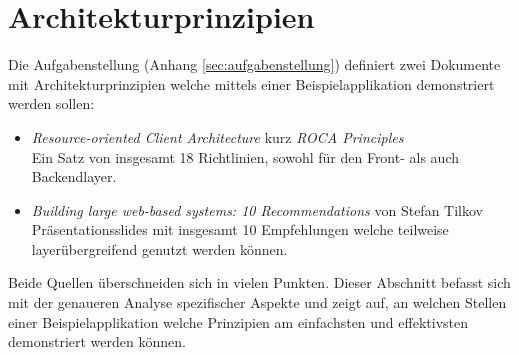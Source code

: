 \section{Architekturprinzipien}

Die Aufgabenstellung (Anhang \ref{sec:aufgabenstellung}) definiert zwei Dokumente mit Architekturprinzipien welche mittels einer Beispielapplikation demonstriert werden sollen:

\begin{itemize}
	\item \textit{Resource-oriented Client Architecture} kurz \textit{ROCA Principles} \cite{ROCA}\\
	Ein Satz von insgesamt 18 Richtlinien, sowohl für den Front- als auch Backendlayer.
	\item \textit{Building large web-based systems: 10 Recommendations} von Stefan Tilkov \cite{TilkovSlides}\\
	Präsentationsslides mit insgesamt 10 Empfehlungen welche teilweise layerübergreifend genutzt werden können.
\end{itemize}

Beide Quellen überschneiden sich in vielen Punkten. Dieser Abschnitt befasst sich mit der genaueren Analyse spezifischer Aspekte und zeigt auf, an welchen Stellen einer Beispielapplikation welche Prinzipien am einfachsten und effektivsten demonstriert werden können.



